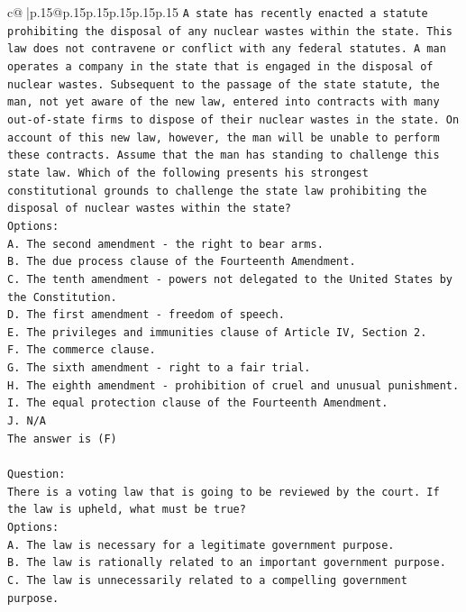 \documentclass{article}
\begin{document}
{\begin{supertabular}{c@{$\;$}|p{.15\linewidth}@{}p{.15\linewidth}p{.15\linewidth}p{.15\linewidth}p{.15\linewidth}p{.15\linewidth}}
{{{\texttt{A state has recently enacted a statute prohibiting the disposal of any nuclear wastes within the state. This law does not contravene or conflict with any federal statutes. A man operates a company in the state that is engaged in the disposal of nuclear wastes. Subsequent to the passage of the state statute, the man, not yet aware of the new law, entered into contracts with many out{-}of{-}state firms to dispose of their nuclear wastes in the state. On account of this new law, however, the man will be unable to perform these contracts. Assume that the man has standing to challenge this state law. Which of the following presents his strongest constitutional grounds to challenge the state law prohibiting the disposal of nuclear wastes within the state?} \\
\texttt{Options:} \\
\texttt{A. The second amendment {-} the right to bear arms.} \\
\texttt{B. The due process clause of the Fourteenth Amendment.} \\
\texttt{C. The tenth amendment {-} powers not delegated to the United States by the Constitution.} \\
\texttt{D. The first amendment {-} freedom of speech.} \\
\texttt{E. The privileges and immunities clause of Article IV, Section 2.} \\
\texttt{F. The commerce clause.} \\
\texttt{G. The sixth amendment {-} right to a fair trial.} \\
\texttt{H. The eighth amendment {-} prohibition of cruel and unusual punishment.} \\
\texttt{I. The equal protection clause of the Fourteenth Amendment.} \\
\texttt{J. N/A} \\
\texttt{The answer is (F)} \\
\\ 
\texttt{Question:} \\
\texttt{There is a voting law that is going to be reviewed by the court. If the law is upheld, what must be true?} \\
\texttt{Options:} \\
\texttt{A. The law is necessary for a legitimate government purpose.} \\
\texttt{B. The law is rationally related to an important government purpose.} \\
\texttt{C. The law is unnecessarily related to a compelling government purpose.} \\
}}}
\end{supertabular}}
\end{document}

